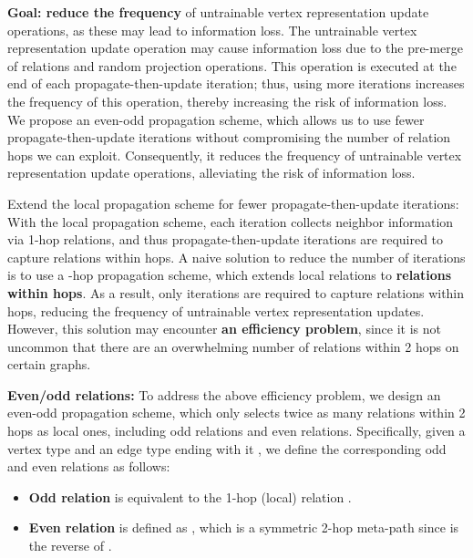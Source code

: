 \documentclass[lettersize,journal]{IEEEtran}
\begin{document}
\textbf{Goal: reduce the frequency} of untrainable vertex representation update operations, as these may lead to information loss.
The untrainable vertex representation update operation may cause information loss due to the pre-merge of relations and random projection operations.
This operation is executed at the end of each propagate-then-update iteration; thus, using more iterations increases the frequency of this operation, thereby increasing the risk of information loss.
We propose an even-odd propagation scheme, which allows us to use fewer propagate-then-update iterations without compromising the number of relation hops we can exploit.
Consequently, it reduces the frequency of untrainable vertex representation update operations, alleviating the risk of information loss.



Extend the local propagation scheme for fewer propagate-then-update iterations:
With the local propagation scheme, each iteration collects neighbor information via 1-hop relations, and thus  propagate-then-update iterations are required to capture relations within  hops.
A naive solution to reduce the number of iterations is to use a -hop propagation scheme, which extends local relations to \textbf{relations within  hops}.
As a result, only  iterations are required to capture relations within  hops, reducing the frequency of untrainable vertex representation updates.
However, this solution may encounter \textbf{an efficiency problem}, since it is not uncommon that there are an overwhelming number of relations within 2 hops on certain graphs.




\textbf{Even/odd relations:}
To address the above efficiency problem, we design an even-odd propagation scheme, which only selects twice as many relations within 2 hops as local ones, including odd relations and even relations.
Specifically, given a vertex type   and an edge type ending with it , we define the corresponding odd and even relations as follows:
\begin{itemize}
\item \textbf{Odd relation} is equivalent to the 1-hop (local) relation .
\item \textbf{Even relation} is defined as , which is a symmetric 2-hop meta-path since  is the reverse of .
\end{itemize}
\end{document}
